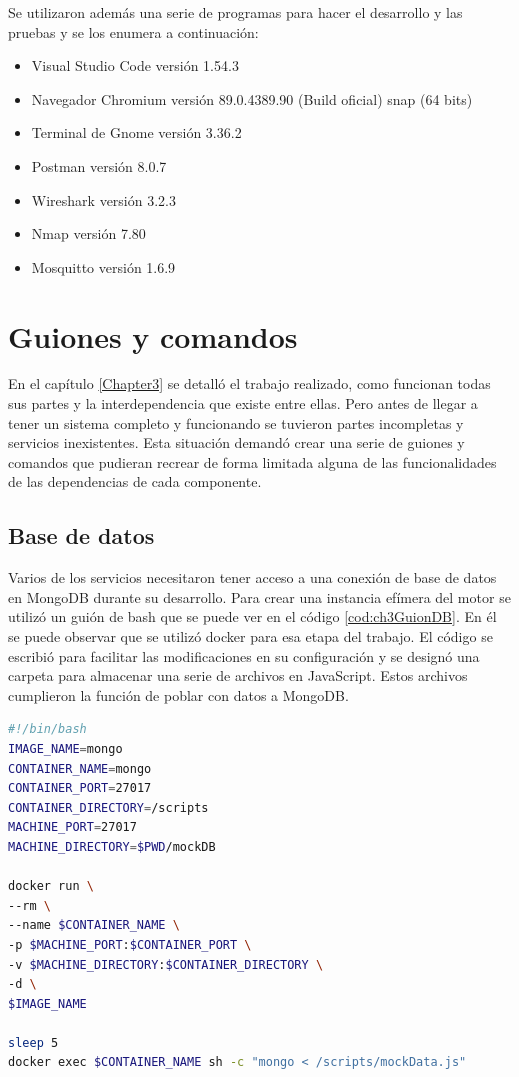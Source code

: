 Se utilizaron además una serie de programas para hacer el desarrollo y las pruebas y se los enumera a continuación:

\begin{itemize}
	\item Visual Studio Code versión 1.54.3
	\item Navegador Chromium versión 89.0.4389.90 (Build oficial) snap (64 bits)
	\item Terminal de Gnome versión 3.36.2
	\item Postman versión 8.0.7
	\item Wireshark versión 3.2.3
	\item Nmap versión 7.80
	\item Mosquitto versión 1.6.9
\end{itemize}

\section{Guiones y comandos}
En el capítulo \ref{Chapter3} se detalló el trabajo realizado, como funcionan todas sus partes y la interdependencia que existe entre ellas.
Pero antes de llegar a tener un sistema completo y funcionando se tuvieron partes incompletas y servicios inexistentes.
Esta situación demandó crear una serie de guiones y comandos que pudieran recrear de forma limitada alguna de las funcionalidades de las dependencias de cada componente.

\subsection{Base de datos}

Varios de los servicios necesitaron tener acceso a una conexión de base de datos en MongoDB durante su desarrollo.
Para crear una instancia efímera del motor se utilizó un guión de bash que se puede ver en el código \ref{cod:ch3GuionDB}.
En él se puede observar que se utilizó docker para esa etapa del trabajo.
El código se escribió para facilitar las modificaciones en su configuración y se designó una carpeta para almacenar una serie de archivos en JavaScript.
Estos archivos cumplieron la función de poblar con datos a MongoDB.

\begin{lstlisting}[language=bash,label=cod:ch3GuionDB,caption=Guión de base de datos.]
#!/bin/bash
IMAGE_NAME=mongo
CONTAINER_NAME=mongo
CONTAINER_PORT=27017
CONTAINER_DIRECTORY=/scripts
MACHINE_PORT=27017
MACHINE_DIRECTORY=$PWD/mockDB

docker run \
--rm \
--name $CONTAINER_NAME \
-p $MACHINE_PORT:$CONTAINER_PORT \
-v $MACHINE_DIRECTORY:$CONTAINER_DIRECTORY \
-d \
$IMAGE_NAME

sleep 5
docker exec $CONTAINER_NAME sh -c "mongo < /scripts/mockData.js"
\end{lstlisting}

